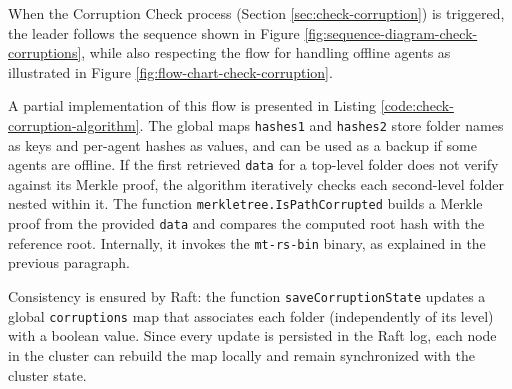 When the Corruption Check process (Section \ref{sec:check-corruption}) is triggered,
the leader follows the sequence shown in Figure
\ref{fig:sequence-diagram-check-corruptions}, while also respecting the flow for
handling offline agents as illustrated in Figure
\ref{fig:flow-chart-check-corruption}.

A partial implementation of this flow is presented in Listing
\ref{code:check-corruption-algorithm}. The global maps \texttt{hashes1} and
\texttt{hashes2} store folder names as keys and per-agent hashes as values, and
can be used as a backup if some agents are offline. If the first retrieved
\texttt{data} for a top-level folder does not verify against its Merkle proof,
the algorithm iteratively checks each second-level folder nested within it. The
function \texttt{merkletree.IsPathCorrupted} builds a Merkle proof from the
provided \texttt{data} and compares the computed root hash with the reference
root. Internally, it invokes the \texttt{mt-rs-bin} binary, as explained in the
previous paragraph.

Consistency is ensured by Raft: the function \texttt{saveCorruptionState} updates
a global \texttt{corruptions} map that associates each folder (independently of
its level) with a boolean value. Since every update is persisted in the Raft
log, each node in the cluster can rebuild the map locally and remain synchronized
with the cluster state.

